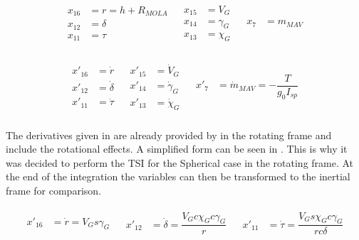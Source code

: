 \begin{align} \label{eq:spherVar}
\begin{split}
x_{16} &= r = h+R_{MOLA} \\
x_{12} &= \delta \\
x_{11} &= \tau \\
\end{split}
&
\begin{split}
x_{15} &= V_{G} \\
x_{14} &= \gamma_{G} \\
x_{13} &= \chi_{G} \\
\end{split}
&
\begin{split}
x_{7} &= m_{MAV} \\
\end{split}
\end{align}

\begin{align} \label{eq:spherVarD}
\begin{split}
x'_{16} &= \dot{r} \\
x'_{12} &= \dot{\delta} \\
x'_{11} &= \dot{\tau} \\
\end{split}
&
\begin{split}
x'_{15} &= \dot{V}_{G} \\
x'_{14} &= \dot{\gamma}_{G} \\
x'_{13} &= \dot{\chi}_{G} \\
\end{split}
&
\begin{split}
x'_{7} &= \dot{m}_{MAV} = -\dfrac{T}{g_{0}I_{sp}} \\
\end{split}
\end{align}

The derivatives given in  are already provided by \citep{mooij1994motion} in the rotating frame and include the rotational effects. A simplified form can be seen in . This is why it was decided to perform the \ac{TSI} for the Spherical case in the rotating frame. At the end of the integration the variables can then be transformed to the inertial frame for comparison.

\begin{align} \label{eq:kinEqSp}
\begin{split}
x'_{16} &= \dot{r} = V_{G} s \gamma_{G} \\
\end{split}
&
\begin{split}
x'_{12} &= \dot{\delta} = \dfrac{V_{G} c \chi_{G} c \gamma_{G}}{r} \\
\end{split}
&
\begin{split}
x'_{11} &= \dot{\tau} = \dfrac{V_{G} s \chi_{G} c \gamma_{G}}{r c \delta} \\
\end{split}
\end{align}


